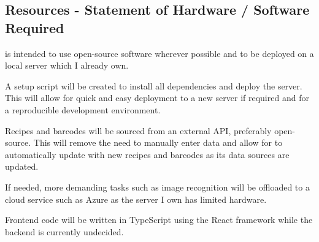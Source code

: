 \documentclass[../CHEFCookingHelperForEveryonesFridge.tex]{subfiles}
\begin{document}
\subsection{Resources - Statement of Hardware / Software Required}
\label{sec:resources_statement}

\chef{} is intended to use open-source software wherever possible and to be deployed on a local server which I already own.

A setup script will be created to install all dependencies and deploy the server. This will allow for quick and easy deployment to a new server
if required and for a reproducible development environment.

Recipes and barcodes will be sourced from an external API, preferably open-source. This will remove the need to manually enter data and allow for
\chef{} to automatically update with new recipes and barcodes as its data sources are updated.

If needed, more demanding tasks such as image recognition will be offloaded to a cloud service such as Azure as the server I own has limited hardware.

Frontend code will be written in TypeScript using the React framework while the backend is currently undecided.
\end{document}
